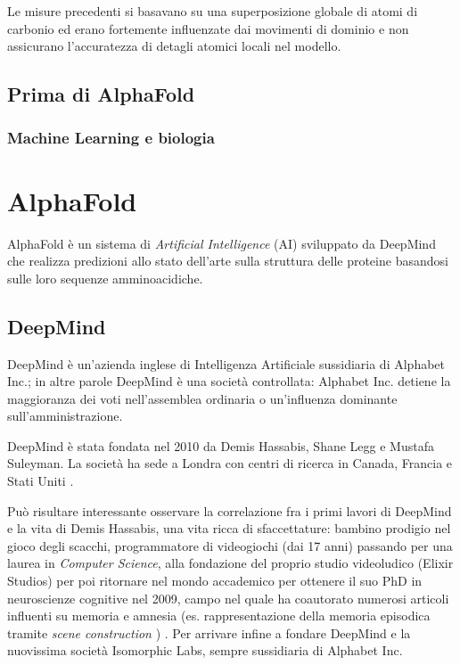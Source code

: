 Le misure precedenti si basavano su una superposizione globale di atomi di carbonio ed erano fortemente influenzate dai movimenti di dominio e non assicurano l'accuratezza di detagli atomici locali nel modello.

\section{Prima di AlphaFold}

\subsection{Machine Learning e biologia}

\chapter{AlphaFold}
AlphaFold è un sistema di \textit{Artificial Intelligence }(AI) sviluppato da DeepMind che realizza predizioni allo stato dell'arte sulla struttura delle proteine basandosi sulle loro sequenze amminoacidiche.

\section{DeepMind}

DeepMind è un'azienda inglese di Intelligenza Artificiale sussidiaria di Alphabet Inc.; in altre parole DeepMind è una società controllata: Alphabet Inc. detiene la maggioranza dei voti nell'assemblea ordinaria o un'influenza dominante sull'amministrazione.

\par DeepMind è stata fondata nel 2010 da Demis Hassabis, Shane Legg e Mustafa Suleyman. La società ha sede a Londra con centri di ricerca in Canada, Francia e Stati Uniti \cite{deepMindWiki}.

Può risultare interessante osservare la correlazione fra i primi lavori di DeepMind e la vita di Demis Hassabis, una vita ricca di sfaccettature: bambino prodigio nel gioco degli scacchi, programmatore di videogiochi (dai 17 anni) passando per una laurea in \textit{Computer Science}, alla fondazione del proprio studio videoludico (Elixir Studios) per poi ritornare nel mondo accademico per ottenere il suo PhD in neuroscienze cognitive nel 2009, campo nel quale ha coautorato numerosi articoli influenti su memoria e amnesia (es. rappresentazione della memoria episodica tramite \textit{scene construction} \cite{Hassabis2007Jul}) \cite{hassabisWiki}. Per arrivare infine a fondare DeepMind e la nuovissima società Isomorphic Labs, sempre sussidiaria di Alphabet Inc.

